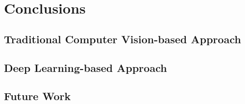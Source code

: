 \chapter{Conclusions}
\label{chpt:conclusion}

\section{Traditional Computer Vision-based Approach}

\section{Deep Learning-based Approach}

\section{Future Work}